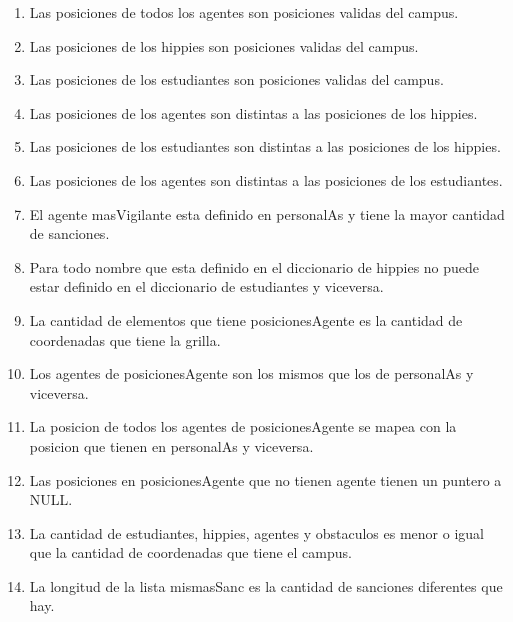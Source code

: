 \begin{enumerate}
	\item Las posiciones de todos los agentes son posiciones validas del campus.
	\item Las posiciones de los hippies son posiciones validas del campus.
	\item Las posiciones de los estudiantes son posiciones validas del campus.
	\item Las posiciones de los agentes son distintas a las posiciones de los hippies.
	\item Las posiciones de los estudiantes son distintas a las posiciones de los hippies.
	\item Las posiciones de los agentes son distintas a las posiciones de los estudiantes.
	\item El agente masVigilante esta definido en personalAs y tiene la mayor cantidad de sanciones.
	\item Para todo nombre que esta definido en el diccionario de hippies no puede estar definido en el diccionario de estudiantes y viceversa.
	\item La cantidad de elementos que tiene posicionesAgente es la cantidad de coordenadas que tiene la grilla.
	\item Los agentes de posicionesAgente son los mismos que los de personalAs y viceversa.
	\item La posicion de todos los agentes de posicionesAgente se mapea con la posicion que tienen en personalAs y viceversa.
	\item Las posiciones en posicionesAgente que no tienen agente tienen un puntero a NULL.
	\item La cantidad de estudiantes, hippies, agentes y obstaculos es menor o igual que la cantidad de coordenadas que tiene el campus.
	\item La longitud de la lista mismasSanc es la cantidad de sanciones diferentes que hay.
	
	
\end{enumerate}

